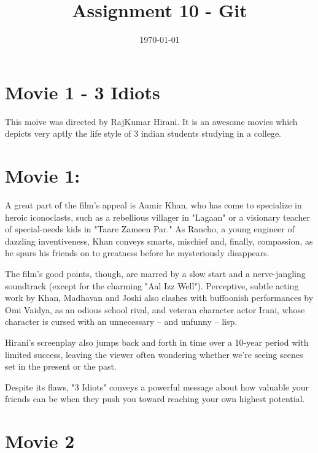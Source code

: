 \documentclass[]{article}
\title{Assignment 10 - Git}
\date{\today}
\begin{document}
\maketitle
\section{Movie 1 - 3 Idiots}
This moive was directed by RajKumar Hirani. It is an awesome movies which depicts very aptly the life style of 3 indian students studying in a college.
\section{Movie 1: }
A great part of the film's appeal is Aamir Khan, who has come to specialize in heroic iconoclasts, such as a rebellious villager in "Lagaan" or a visionary teacher of special-needs kids in "Taare Zameen Par." As Rancho, a young engineer of dazzling inventiveness, Khan conveys smarts, mischief and, finally, compassion, as he spurs his friends on to greatness before he mysteriously disappears.

The film's good points, though, are marred by a slow start and a nerve-jangling soundtrack (except for the charming "Aal Izz Well"). Perceptive, subtle acting work by Khan, Madhavan and Joshi also clashes with buffoonish performances by Omi Vaidya, as an odious school rival, and veteran character actor Irani, whose character is cursed with an unnecessary -- and unfunny -- lisp.

Hirani's screenplay also jumps back and forth in time over a 10-year period with limited success, leaving the viewer often wondering whether we're seeing scenes set in the present or the past.

Despite its flaws, "3 Idiots" conveys a powerful message about how valuable your friends can be when they push you toward reaching your own highest potential.
\section{Movie 2}
\end{document}
